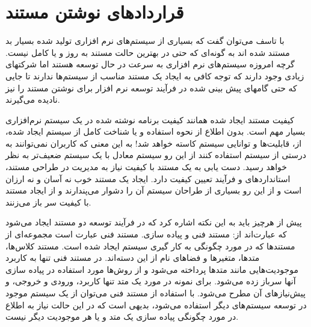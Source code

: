 %
% 
% 
% 
%
\part{قراردادهای نوشتن مستند}

با تاسف می‌توان گفت که بسیاری از سیستم‌های نرم افزاری تولید شده بسیار بد
مستند شده اند به گونه‌ای که حتی در بهترین حالت مستند به روز و یا کامل نیست.
گرچه امروزه سیستم‌های نرم افزاری به سرعت در حال توسعه هستند اما شرکتهای
زیادی وجود دارند که توجه کافی به ایجاد یک مستند مناسب از سیستم‌ها ندارند تا
جایی که حتی گامهای پیش بینی شده در فرآیند توسعه نرم افزار برای نوشتن مستند
را نیز نادیده می‌گیرند.

کیفیت مستند ایجاد شده همانند کیفیت برنامه نوشته شده در یک سیستم نرم‌افزاری
بسیار مهم است. بدون اطلاع از نحوه استفاده و یا شناخت کامل از سیستم ایجاد
شده، از، قابلیت‌ها و توانایی سیستم کاسته خواهد شد! به این معنی که کاربران
نمی‌توانند به درستی از سیستم استفاده کنند از این رو سیستم معادل با یک سیستم
ضعیف‌تر به نظر خواهد رسید.
دست یابی به یک مستند با کیفیت نیاز به مدیریت در طراحی مستند، استانداردهای و
فرآیند تعیین کیفیت دارد.
ایجاد یک مستند خوب نه آسان و نه ارزان است و از این رو بسیاری از طراحان سیستم
آن را دشوار می‌پندارند و از ایجاد مستند با کیفیت سر باز می‌زنند.

پیش از هرچیز باید به این نکته اشاره کرد که در فرآیند توسعه دو مستند ایجاد می‌شود که
عبارت‌اند از: مستند فنی و پیاده سازی. مستند فنی عبارت است مجموعه‌ای از مستند‌ها که در 
مورد چگونگی به کار گیری سیستم ایجاد شده است. مستند کلاس‌ها، متدها، متغیرها و فضاهای نام
از این دسته‌اند. در مستند فنی تنها به کاربرد موجودیت‌هایی مانند متدها پرداخته می‌شود 
و از روش‌ها مورد استفاده در پیاده سازی آنها سرباز زده می‌شود. برای نمونه در مورد یک 
متد تنها کاربرد، ورودی و خروجی، و پیش‌نیازهای آن مطرح می‌شود. با استفاده از مستند فنی
می‌توان از یک سیستم موجود در توسعه سیستم‌های دیگر استفاده می‌شود، بدیهی است که در این 
حالت نیاز به اطلاع در مورد چگونگی پیاده سازی یک متد و یا هر موجودیت دیگر نیست.

